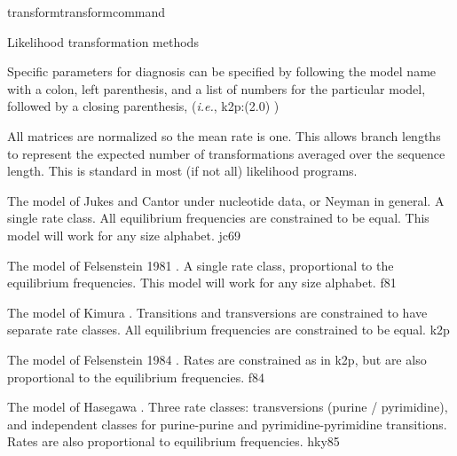 \begin{command}{transform}{transformcommand}
\begin{arguments}
\begin{argumentgroup}{Likelihood transformation methods}
{                Specific parameters for diagnosis can be specified by following
                the model name with a colon, left parenthesis, and a list of
                numbers for the particular model, followed by a closing
                parenthesis, (\emph{i.e.}, k2p:(2.0) )

                \begin{statement}
                    All matrices are normalized so the mean rate is one. This
                    allows branch lengths to represent the expected number of
                    transformations averaged over the sequence length. This is
                    standard in most (if not all) likelihood programs.
                \end{statement}

                \begin{description}

                        {The model of Jukes and Cantor \cite{jukesandcantor1969}
                        under nucleotide data, or Neyman \cite{neyman1971} in general. A
                        single rate class. All equilibrium frequencies are
                        constrained to be equal. This model will work for any size
                        alphabet.}
                        {jc69}

                        {The model of Felsenstein 1981 \cite{felsenstein1981}. A
                        single rate class, proportional to the equilibrium
                        frequencies. This model will work for any size
                        alphabet.}
                        {f81}

                        {The model of Kimura \cite{kimura1980}. Transitions and
                        transversions are constrained to have separate rate
                        classes. All equilibrium frequencies are constrained to be
                        equal.}
                        {k2p}

                        {The model of Felsenstein 1984 \cite{felsenstein1980}. Rates
                        are constrained as in k2p, but are also proportional to
                        the equilibrium frequencies.}
                        {f84}

                        {The model of Hasegawa \cite{hasegawa1984}. Three rate classes:
                        transversions (purine / pyrimidine), and independent
                        classes for purine-purine and pyrimidine-pyrimidine
                        transitions. Rates are also proportional to equilibrium
                        frequencies.}
                        {hky85}


\end{description}}
\end{argumentgroup}
\end{arguments}
\end{command}
